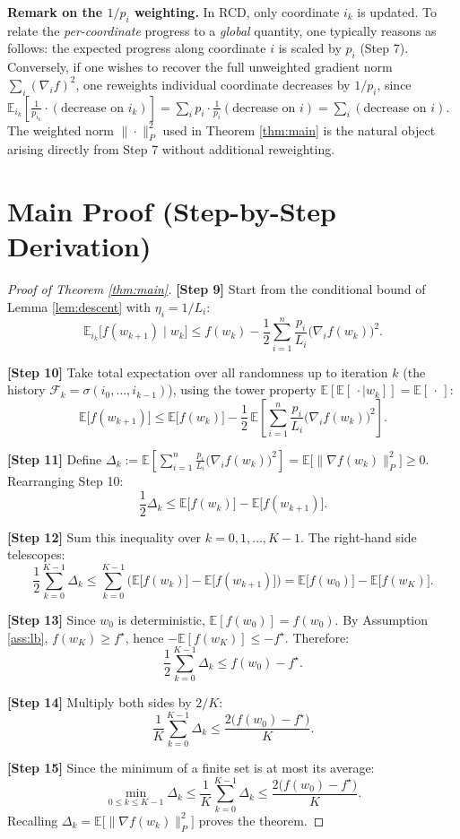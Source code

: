 \documentclass{article}
\begin{document}
\noindent\textbf{Remark on the $1/p_i$ weighting.} In RCD, only coordinate $i_k$ is
updated. To relate the \emph{per-coordinate} progress to a \emph{global} quantity, one
typically reasons as follows: the expected progress along coordinate $i$ is scaled by
$p_i$ (Step 7). Conversely, if one wishes to recover the full unweighted gradient norm
$\sum_i (\nabla_i f)^2$, one reweights individual coordinate decreases by $1/p_i$, since
$\mathbb{E}_{i_k}[\frac{1}{p_{i_k}} \cdot (\text{decrease on } i_k)]
= \sum_i p_i \cdot \frac{1}{p_i} (\text{decrease on } i) = \sum_i (\text{decrease on } i)$.
The weighted norm $\|\cdot\|_P^2$ used in Theorem \ref{thm:main} is the natural object
arising directly from Step 7 without additional reweighting.

\section*{Main Proof (Step-by-Step Derivation)}

\begin{proof}[Proof of Theorem \ref{thm:main}]
\textbf{[Step 9]} Start from the conditional bound of Lemma \ref{lem:descent} with
$\eta_i = 1/L_i$:
\[
\mathbb{E}_{i_k}\big[ f(w_{k+1}) \mid w_k \big]
\le f(w_k) - \frac12 \sum_{i=1}^n \frac{p_i}{L_i}\big(\nabla_i f(w_k)\big)^2 .
\]

\textbf{[Step 10]} Take total expectation over all randomness up to iteration $k$
(the history $\mathcal{F}_k = \sigma(i_0,\dots,i_{k-1})$), using the tower property
$\mathbb{E}[\mathbb{E}[\,\cdot \mid w_k]] = \mathbb{E}[\,\cdot\,]$:
\[
\mathbb{E}\big[ f(w_{k+1}) \big]
\le \mathbb{E}\big[ f(w_k) \big]
- \frac12\, \mathbb{E}\!\left[ \sum_{i=1}^n \frac{p_i}{L_i}\big(\nabla_i f(w_k)\big)^2 \right].
\]

\textbf{[Step 11]} Define $\Delta_k := \mathbb{E}\!\left[ \sum_{i=1}^n
\frac{p_i}{L_i}\big(\nabla_i f(w_k)\big)^2 \right]
= \mathbb{E}\big[\|\nabla f(w_k)\|_P^2\big] \ge 0$. Rearranging Step 10:
\[
\frac12 \Delta_k \le \mathbb{E}\big[ f(w_k) \big] - \mathbb{E}\big[ f(w_{k+1}) \big].
\]

\textbf{[Step 12]} Sum this inequality over $k = 0, 1, \dots, K-1$. The right-hand
side telescopes:
\[
\frac12 \sum_{k=0}^{K-1} \Delta_k
\le \sum_{k=0}^{K-1}\Big( \mathbb{E}\big[ f(w_k) \big]
- \mathbb{E}\big[ f(w_{k+1}) \big] \Big)
= \mathbb{E}\big[ f(w_0) \big] - \mathbb{E}\big[ f(w_K) \big].
\]

\textbf{[Step 13]} Since $w_0$ is deterministic, $\mathbb{E}[f(w_0)] = f(w_0)$.
By Assumption \ref{ass:lb}, $f(w_K) \ge f^\star$, hence
$-\mathbb{E}[f(w_K)] \le -f^\star$. Therefore:
\[
\frac12 \sum_{k=0}^{K-1} \Delta_k \le f(w_0) - f^\star .
\]

\textbf{[Step 14]} Multiply both sides by $2/K$:
\[
\frac{1}{K} \sum_{k=0}^{K-1} \Delta_k \le \frac{2\big(f(w_0) - f^\star\big)}{K}.
\]

\textbf{[Step 15]} Since the minimum of a finite set is at most its average:
\[
\min_{0 \le k \le K-1} \Delta_k
\le \frac{1}{K} \sum_{k=0}^{K-1} \Delta_k
\le \frac{2\big(f(w_0) - f^\star\big)}{K}.
\]
Recalling $\Delta_k = \mathbb{E}\big[\|\nabla f(w_k)\|_P^2\big]$ proves the theorem.
\end{proof}
\end{document}
